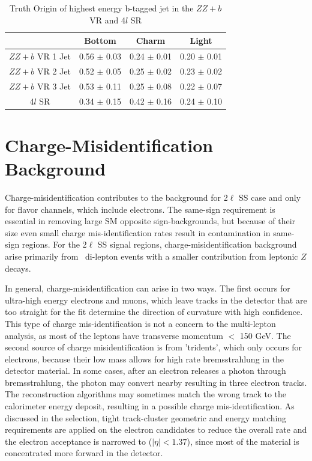 \begin{table}[htbp]
\centering 
\begin{tabular}{|c|c|c|c|} 
  \hline
                 & Bottom      & Charm       & Light \\
  \hline
  $ZZ+b$ VR 1 Jet& 0.56 $\pm$ 0.03 & 0.24 $\pm$ 0.01 & 0.20 $\pm$ 0.01 \\ 
  $ZZ+b$ VR 2 Jet& 0.52 $\pm$ 0.05 & 0.25 $\pm$ 0.02 & 0.23 $\pm$ 0.02 \\ 
  $ZZ+b$ VR 3 Jet& 0.53 $\pm$ 0.11 & 0.25 $\pm$ 0.08 & 0.22 $\pm$ 0.07 \\
  4$l$ SR        & 0.34 $\pm$ 0.15 & 0.42 $\pm$ 0.16 & 0.24 $\pm$ 0.10 \\
  \hline 
\end{tabular}
\caption{Truth Origin of highest energy b-tagged jet in the $ZZ+b$ VR and 4$l$ SR} 
\label{table:zz_truth}
\end{table} 


\section{Charge-Misidentification Background }
\label{section:qmis} 
Charge-misidentification contributes to the background for 2$\ell$ SS case and only for flavor channels, which include electrons. The same-sign requirement is essential in removing large SM opposite sign-backgrounds, but because of their size even small charge mis-identification rates result in contamination in same-sign regions. For the 2$\ell$ SS signal regions, charge-misidentification background arise primarily from \ttbar\ di-lepton events with a smaller contribution from leptonic $Z$ decays. 

In general, charge-misidentification can arise in two ways. The first occurs for ultra-high energy electrons and muons, which leave tracks in the detector that are too straight for the fit determine the direction of curvature with high confidence. This type of charge mis-identification is not a concern to the \tth multi-lepton analysis, as most of the leptons have transverse momentum $<$ 150 GeV. The second source of charge misidentification is from 'tridents', which only occurs for electrons, because their low mass allows for high rate bremsstrahlung in the detector material. In some cases, after an electron releases a photon through bremsstrahlung, the photon may convert nearby resulting in three electron tracks. The reconstruction algorithms may sometimes match the wrong track to the calorimeter energy deposit, resulting in a possible charge mis-identification. As discussed in the selection, tight track-cluster geometric and energy matching requirements are applied on the electron candidates to reduce the overall rate and the electron acceptance is narrowed to ($|\eta| < 1.37$), since most of the material is concentrated more forward in the detector. 


